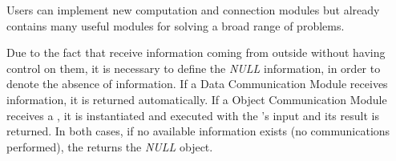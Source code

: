 Users can implement new computation and connection modules but \posl{} already contains many useful modules for solving a broad range of problems.

Due to the fact that \opchs{} receive information coming from outside without having control on them, it is necessary to define the {\it NULL} information, in order to denote the absence of information. If a Data Communication Module receives information, it is returned automatically. If a Object Communication Module receives a \om{}, it is instantiated and executed with the \opch's input and its result is returned. In both cases, if no available information exists (no communications performed), the \opch{} returns the {\it NULL} object.